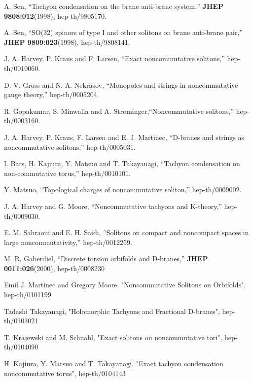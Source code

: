 \documentclass[a4paper,12pt]{article}
\begin{document}
\begin{thebibliography}{10}
  A. Sen, ``Tachyon condensation on the brane anti-brane
system,'' \textbf{JHEP 9808:012}(1998), hep-th/9805170.

  A. Sen, ``SO(32) spinors of type I and other solitons on
brane anti-brane pair,'' \textbf{JHEP 9809:023}(1998), hep-th/9808141.

  J. A. Harvey, P. Kraus and F. Larsen, ``Exact
noncommutative solitons,'' hep-th/0010060.

  D. V. Gross and N. A. Nekrasov, ``Monopoles and strings in
noncommutative gauge theory,'' hep-th/0005204.

  R. Gopakumar, S. Minwalla and A.
Strominger,``Noncommutative solitons,'' hep-th/0003160.

   J. A. Harvey, P. Kraus, F. Larsen and E. J. Martinec,
``D-branes and strings as noncommutative solitons,'' hep-th/0005031.


  I. Bars, H. Kajiura, Y. Matsuo and T. Takayanagi, ``Tachyon
condensation on non-commutative torus,'' hep-th/0010101.

 Y. Matsuo, ``Topological charges of noncommutative soliton,'' hep-th/0009002.

  J. A. Harvey and G. Moore, ``Noncommutative tachyons and K-theory,'' hep-th/0009030.

 E. M. Sahraoui and E. H. Saidi, ``Solitons on compact and noncompact spaces in large noncommutativity,'' hep-th/0012259.

 M. R. Gaberdiel, ``Discrete torsion orbifolds and D-branes,'' {\bf JHEP 0011:026}(2000), hep-th/0008230

 Emil J. Martinec and Gregory Moore,
"Noncommutative Solitons on Orbifolds", hep-th/0101199

 Tadashi Takayanagi, "Holomorphic Tachyons and Fractional
D-branes", hep-th/0103021

 T. Krajewski and M. Schnabl, "Exact solitons on
noncommutative tori", hep-th/0104090

 H. Kajiura, Y. Matsuo and T. Takayanagi, "Exact
tachyon condensation noncommutative torus", hep-th/0104143

\end{thebibliography}
\end{document}
